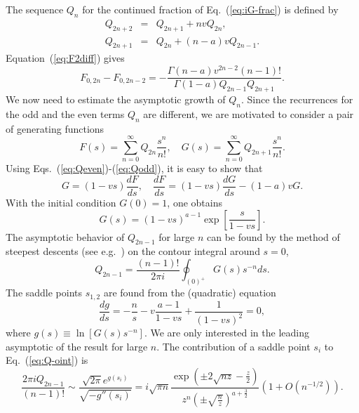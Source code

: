 \documentclass{llncs}
\begin{document}
The sequence $Q_{n}$ for the continued fraction of Eq.~(\ref{eq:iG-frac})
is defined by\begin{eqnarray}
Q_{2n+2} & = & Q_{2n+1}+nvQ_{2n},\label{eq:Qeven}\\
Q_{2n+1} & = & Q_{2n}+\left(n-a\right)vQ_{2n-1}.\label{eq:Qodd}
\end{eqnarray}
Equation~(\ref{eq:F2diff}) gives\[
F_{0,2n}-F_{0,2n-2}=-\frac{\Gamma \left(n-a\right)v^{2n-2}\left(n-1\right)!}{\Gamma \left(1-a\right)Q_{2n-1}Q_{2n+1}}.\]
 We now need to estimate the asymptotic growth of $Q_{n}$. Since
the recurrences for the odd and the even terms $Q_{n}$ are different,
we are motivated to consider a pair of generating functions\begin{equation}
F\left(s\right)=\sum _{n=0}^{\infty }Q_{2n}\frac{s^{n}}{n!},\quad G\left(s\right)=\sum _{n=0}^{\infty }Q_{2n+1}\frac{s^{n}}{n!}.\end{equation}
Using Eqs.~(\ref{eq:Qeven})-(\ref{eq:Qodd}), it is easy to show
that\begin{equation}
G=\left(1-vs\right)\frac{dF}{ds},\quad \frac{dF}{ds}=\left(1-vs\right)\frac{dG}{ds}-\left(1-a\right)vG.\end{equation}
With the initial condition $G\left(0\right)=1$, one obtains\begin{equation}
G\left(s\right)=\left(1-vs\right)^{a-1}\exp \left[\frac{s}{1-vs}\right].\end{equation}
The asymptotic behavior of $Q_{2n-1}$ for large $n$ can be found
by the method of steepest descents (see e.g.~\cite{Olver74}) on
the contour integral around $s=0$,\begin{equation}
Q_{2n-1}=\frac{\left(n-1\right)!}{2\pi i}\oint _{\left(0\right)^{+}}G\left(s\right)s^{-n}ds.\label{eq:Q-oint}\end{equation}
The saddle points $s_{1,2}$ are found from the (quadratic) equation\begin{equation}
\frac{dg}{ds}=-\frac{n}{s}-v\frac{a-1}{1-vs}+\frac{1}{\left(1-vs\right)^{2}}=0,\end{equation}
where $g\left(s\right)\equiv \ln \left[G\left(s\right)s^{-n}\right]$.
We are only interested in the leading asymptotic of the result for
large $n$. The contribution of a saddle point $s_{i}$ to Eq.~(\ref{eq:Q-oint})
is\begin{equation}
\frac{2\pi iQ_{2n-1}}{\left(n-1\right)!}\sim \frac{\sqrt{2\pi }e^{g\left(s_{i}\right)}}{\sqrt{-g''\left(s_{i}\right)}}=i\sqrt{\pi n}\frac{\exp \left(\pm 2\sqrt{nz}-\frac{z}{2}\right)}{z^{n}\left(\pm \sqrt{\frac{n}{z}}\right)^{a+\frac{3}{2}}}\left(1+O\left(n^{-1/2}\right)\right).\end{equation}
\end{document}
